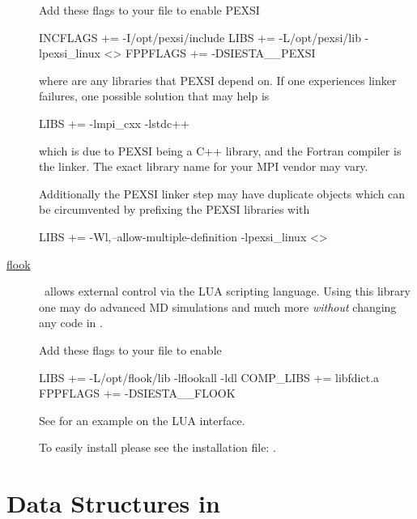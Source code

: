 \begin{description}
  Add these flags to your  file to enable PEXSI
\begin{shellexample}
  INCFLAGS += -I/opt/pexsi/include
  LIBS += -L/opt/pexsi/lib -lpexsi_linux <>
  FPPFLAGS += -DSIESTA__PEXSI
\end{shellexample}
  where \shell{<>} are any libraries that PEXSI depend on. 
  If one experiences linker failures, one possible solution that may
  help is
\begin{shellexample}
  LIBS += -lmpi_cxx -lstdc++
\end{shellexample}
  which is due to PEXSI being a C++ library, and the Fortran compiler
  is the linker. The exact library name for your MPI vendor may
  vary. 

  Additionally the PEXSI linker step may have duplicate objects which
  can be circumvented by prefixing the PEXSI libraries with
\begin{shellexample}
  LIBS += -Wl,--allow-multiple-definition -lpexsi_linux <>
\end{shellexample}


  \item[\href{https://github.com/electronicstructurelibrary/flook}{flook}]%
  \siesta\ allows external control via the LUA scripting language.
  Using this library one may do advanced MD simulations and much more
  \emph{without} changing any code in \siesta.
  
  Add these flags to your  file to enable 
\begin{shellexample}
  LIBS += -L/opt/flook/lib -lflookall -ldl
  COMP_LIBS += libfdict.a
  FPPFLAGS += -DSIESTA__FLOOK
\end{shellexample}
  
  See  for an example on the LUA interface.

  To easily install  please see the installation file:
  .

\end{description}


\ifdeveloper
\section{Data Structures in \texorpdfstring{\siesta}{siesta}}

